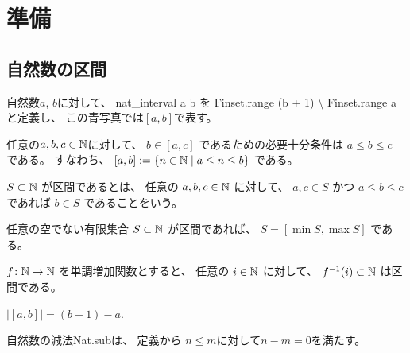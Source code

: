 \chapter{準備}

\section{自然数の区間}

\begin{definition}
\label{df:nat_interval}
\leanok
自然数$a$, $b$に対して、
\textsf{nat\_interval a b}
を
\textsf{Finset.range (b + 1) {\textbackslash} Finset.range a}
と定義し、
この青写真では$[a,b]$で表す。
\end{definition}

\begin{lemma}
\label{lm:nat_interval_mem}
\leanok
任意の$a,b,c \in \mathbb{N}$に対して、
$
b \in [a, c]
$
であるための必要十分条件は
$
a \le b \le c
$
である。
すなわち、
$
[a, b] := \{n \in \mathbb{N} \mid a \le n \le b\}
$
である。
\end{lemma}

\begin{definition}
\label{df:IsInterval}
\leanok
$
S \subset \mathbb{N}
$
が区間であるとは、
任意の
$
a, b, c \in \mathbb{N}
$
に対して、
$
a, c \in S
$
かつ
$
a \le b \le c
$
であれば
$
b \in S
$
であることをいう。
\end{definition}

\begin{lemma}
\label{lm:nonempty_interval_range}
\leanok
任意の空でない有限集合
$
S \subset \mathbb{N}
$
が区間であれば、
$
S = [\min S, \max S]
$
である。
\end{lemma}

\begin{lemma}
\label{lm:preimage_of_monotone_isInterval}
\leanok
$
f \colon \mathbb{N} \to \mathbb{N}
$
を単調増加関数とすると、
任意の
$
i \in \mathbb{N}
$
に対して、
$
f^{-1}(i) \subset \mathbb{N}
$
は区間である。
\end{lemma}

\begin{lemma}
\label{lm:nat_interval_card}
\leanok
$
|[a,b]| = (b+1) - a
$.
\end{lemma}

\begin{remark}
自然数の減法\textsf{Nat.sub}は、
定義から
$n \le m$に対して$n-m=0$を満たす。
\end{remark}

